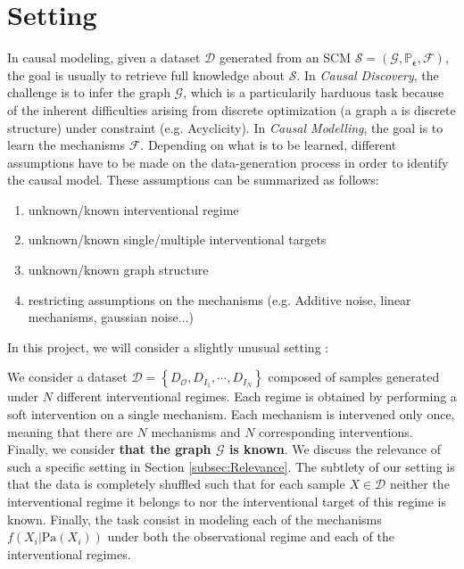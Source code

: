 \documentclass{article}
\begin{document}
\section{Setting}\label{subsec:setting}

In causal modeling, given a dataset $\mathcal{D}$ generated from an SCM $\mathcal{S}= (\mathcal{G}, \mathbb{P}_{\boldsymbol{\epsilon}}, \mathcal{F})$, the goal is usually to retrieve full knowledge about $\mathcal{S}$. In \textit{Causal Discovery}, the challenge is to infer the graph $\mathcal{G}$, which is a particularily harduous task because of the inherent difficulties arising from discrete optimization (a graph a is discrete structure) under constraint (e.g. Acyclicity). In \textit{Causal Modelling}, the goal is to learn the mechanisms $\mathcal{F}$. Depending on what is to be learned, different assumptions have to be made on the data-generation process in order to identify the causal model. These assumptions can be summarized as follows:
\begin{enumerate}
    \item unknown/known interventional regime
    \item unknown/known single/multiple interventional targets
    \item unknown/known graph structure
    \item restricting assumptions on the mechanisms (e.g. Additive noise, linear mechanisms, gaussian noise...)
\end{enumerate}

In this project, we will consider a slightly unusual setting :

We consider a dataset $\mathcal{D} = \left\{ D_{\mathcal{O}},D_{I_1}, \cdots, D_{I_N} \right\}$ composed of samples generated under $N$ different interventional regimes. Each regime is obtained by performing a soft intervention on a single mechanism. Each mechanism is intervened only once, meaning that there are $N$ mechanisms and $N$ corresponding interventions. Finally, we consider \textbf{that the graph $\mathcal{G}$ is known}. We discuss the relevance of such a specific setting in Section \ref{subsec:Relevance}.
 The subtlety of our setting is that the data is completely shuffled such that for each sample $X \in \mathcal{D}$ neither the interventional regime it belongs to nor the interventional target of this regime is known. Finally, the task consist in modeling each of the mechanisms $f(X_i | \text{Pa}(X_i))$ under both the observational regime and each of the interventional regimes.
\end{document}
